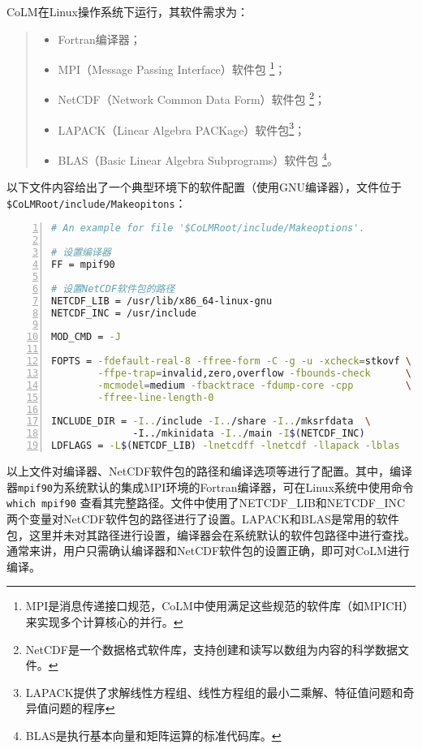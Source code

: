 CoLM在Linux操作系统下运行，其软件需求为：
\begin{quote}
\begin{itemize}
\setlength{\itemsep}{0pt}
\setlength{\parsep}{0pt}
\setlength{\parskip}{0pt}
    \item Fortran编译器；
    \item MPI（Message Passing Interface）软件包 \footnote{MPI是消息传递接口规范，CoLM中使用满足这些规范的软件库（如MPICH）来实现多个计算核心的并行。}；
    \item NetCDF（Network Common Data Form）软件包 \footnote{NetCDF是一个数据格式软件库，支持创建和读写以数组为内容的科学数据文件。}；
    \item LAPACK（Linear Algebra PACKage）软件包\footnote{LAPACK提供了求解线性方程组、线性方程组的最小二乘解、特征值问题和奇异值问题的程序}；
    \item BLAS（Basic Linear Algebra Subprograms）软件包 \footnote{BLAS是执行基本向量和矩阵运算的标准代码库。}。
\end{itemize}
\end{quote}

以下文件内容给出了一个典型环境下的软件配置（使用GNU编译器），文件位于\texttt{\$CoLMRoot/include/\allowbreak Makeopitons}：
\begin{lstlisting}[language=bash, basicstyle=\linespread{1.2}\footnotesize\ttfamily, commentstyle=\color{olive}, numbers=left, numberstyle=\tiny, xleftmargin=1.5em,xrightmargin=0em, aboveskip=1em]
# An example for file '$CoLMRoot/include/Makeoptions'.

# 设置编译器
FF = mpif90

# 设置NetCDF软件包的路径
NETCDF_LIB = /usr/lib/x86_64-linux-gnu
NETCDF_INC = /usr/include

MOD_CMD = -J

FOPTS = -fdefault-real-8 -ffree-form -C -g -u -xcheck=stkovf \
        -ffpe-trap=invalid,zero,overflow -fbounds-check      \
        -mcmodel=medium -fbacktrace -fdump-core -cpp         \
        -ffree-line-length-0

INCLUDE_DIR = -I../include -I../share -I../mksrfdata  \ 
              -I../mkinidata -I../main -I$(NETCDF_INC)
LDFLAGS = -L$(NETCDF_LIB) -lnetcdff -lnetcdf -llapack -lblas

\end{lstlisting}

以上文件对编译器、NetCDF软件包的路径和编译选项等进行了配置。其中，编译器\texttt{mpif90}为系统默认的集成MPI环境的Fortran编译器，可在Linux系统中使用命令 \texttt{which mpif90} 查看其完整路径。文件中使用了NETCDF\_LIB和NETCDF\_INC两个变量对NetCDF软件包的路径进行了设置。LAPACK和BLAS是常用的软件包，这里并未对其路径进行设置，编译器会在系统默认的软件包路径中进行查找。通常来讲，用户只需确认编译器和NetCDF软件包的设置正确，即可对CoLM进行编译。

